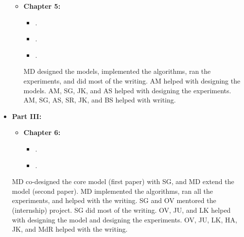 \begin{itemize}
\begin{itemize}
            \item[] \textbf{Chapter 5:} \emph{}
            \begin{itemize}[label=\textbullet] 
                \item {}.
                \item {}.
                \item {}.
            \end{itemize}
            {\footnotesize{MD designed the models, implemented the algorithms, ran the experiments, and did most of the writing. 
            AM helped with designing the models. AM, SG, JK, and AS helped with designing the experiments. AM, SG, AS, SR, JK, and BS helped with writing.}\medskip}
        \end{itemize}
%   
    \item[] \textbf{Part III:} \emph{}
%  
        \begin{itemize}
            \setlength{\itemindent}{-33pt}
            \item[] \textbf{Chapter 6:} \emph{}
            \begin{itemize}[label=\textbullet] 
                \item {}.
                \item {}.
            \end{itemize}
        \end{itemize}
        {\footnotesize{MD co-designed the core model (first paper) with SG, and MD extend the model (second paper). MD implemented the algorithms, ran all the experiments, and helped with the writing. SG and OV mentored the (internship) project. SG did most of the writing. OV, JU, and LK helped with designing the model and designing the experiments. OV, JU, LK, HA, JK, and MdR helped with the writing.}\medskip}
%
\end{itemize}


